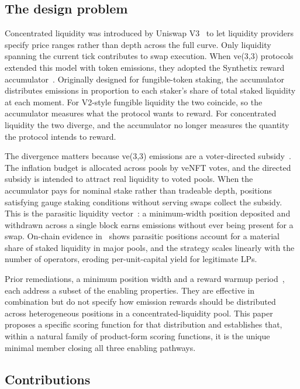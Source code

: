 \documentclass[11pt,a4paper]{article}
\theoremstyle{cgdefinition}
\theoremstyle{cgplain}
\theoremstyle{cgremark}
\begin{document}
\subsection{The design problem}\label{sec:problem}

Concentrated liquidity was introduced by Uniswap V3~\cite{adams2021} to let liquidity providers specify price ranges rather than depth across the full curve. Only liquidity spanning the current tick contributes to swap execution. When ve(3,3) protocols extended this model with token emissions, they adopted the Synthetix reward accumulator~\cite{synthetix2019}. Originally designed for fungible-token staking, the accumulator distributes emissions in proportion to each staker's share of total staked liquidity at each moment. For V2-style fungible liquidity the two coincide, so the accumulator measures what the protocol wants to reward. For concentrated liquidity the two diverge, and the accumulator no longer measures the quantity the protocol intends to reward.

The divergence matters because ve(3,3) emissions are a voter-directed subsidy~\cite{cronje2022}. The inflation budget is allocated across pools by veNFT votes, and the directed subsidy is intended to attract real liquidity to voted pools. When the accumulator pays for nominal stake rather than tradeable depth, positions satisfying gauge staking conditions without serving swaps collect the subsidy. This is the parasitic liquidity vector~\cite{ryan2026c}: a minimum-width position deposited and withdrawn across a single block earns emissions without ever being present for a swap. On-chain evidence in~\cite{ryan2026c} shows parasitic positions account for a material share of staked liquidity in major pools, and the strategy scales linearly with the number of operators, eroding per-unit-capital yield for legitimate LPs.

Prior remediations, a minimum position width and a reward warmup period~\cite[\S5]{ryan2026c}, each address a subset of the enabling properties. They are effective in combination but do not specify how emission rewards should be distributed across heterogeneous positions in a concentrated-liquidity pool. This paper proposes a specific scoring function for that distribution and establishes that, within a natural family of product-form scoring functions, it is the unique minimal member closing all three enabling pathways.

\subsection{Contributions}\label{sec:contributions}
\end{document}
